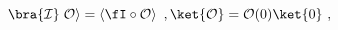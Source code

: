 \begin{equation}
\bra{\mathcal{I}}\left.\mathcal{O}\right>=
\left<\fI\circ \mathcal{O}\right> \ , 
\ket{\mathcal{O}}=\mathcal{O}(0)\ket{0} \ , 
\end{equation}

